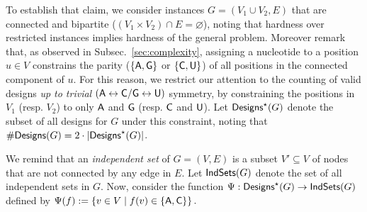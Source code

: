 \documentclass{bioinfo}
\newcommand{\Def}[1]{{\it #1}}
\newcommand{\Design}[1]{{\sf Designs}^{\star}(#1)}
\newcommand{\NumDesign}{\ensuremath{\#}{\sf Designs}\xspace}
\newcommand{\IS}[1]{{\sf IndSets}(#1)}
\newcommand{\Nuc}[1]{{\sf #1}}
\newcommand{\Ab}{\Nuc{A}}
\newcommand{\Cb}{\Nuc{C}}
\newcommand{\Gb}{\Nuc{G}}
\newcommand{\Ub}{\Nuc{U}}
\begin{document}
To establish that claim, we consider instances $G=(V_1\cup V_2, E)$ that are connected and bipartite ($(V_1\times V_2) \cap E = \varnothing$), noting that hardness over restricted instances implies hardness of the general problem. Moreover remark that, as observed in Subsec.~\ref{sec:complexity}, assigning a nucleotide to a position $u\in V$ constrains the parity ($\{\Ab,\Gb\}$ or $\{\Cb,\Ub\}$) of all positions in the connected component of $u$. For this reason, we restrict our attention to the counting of valid designs \emph{up to trivial} $(\Ab\leftrightarrow \Cb/\Gb\leftrightarrow \Ub)$ symmetry, by constraining the positions in $V_{1}$ (resp. $V_2$) to only $\Ab$ and $\Gb$ (resp. $\Cb$ and $\Ub$). Let $\Design{G}$ denote the subset of all designs for $G$ under this constraint, noting that $\NumDesign(G) = 2\cdot|\Design{G}|$. 


We remind that an \Def{independent set} of $G=(V,E)$ is a subset $V'\subseteq V$ of nodes that are not connected by any edge in $E$. Let $\IS{G}$ denote the set of all independent sets in $G$. 
Now, consider the function $\Psi: \Design{G} \to \IS{G}$ defined by $ \Psi(f) := \left\{v\in V\mid f(v)\in\{\Ab,\Cb\}\right\}.$
\end{document}
